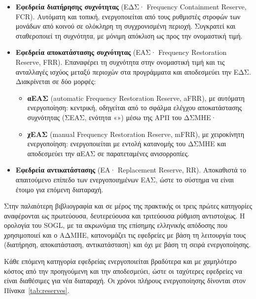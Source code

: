 \begin{itemize}
\item \textbf{Εφεδρεία διατήρησης συχνότητας} (ΕΔΣ· Frequency Containment Reserve, FCR).
      Αυτόματη και τοπική, ενεργοποιείται από τους ρυθμιστές στροφών των μονάδων από κοινού σε
      ολόκληρη τη συγχρονισμένη περιοχή. Συγκρατεί και σταθεροποιεί τη συχνότητα, με μόνιμη
      απόκλιση ως προς την ονομαστική τιμή.
\item \textbf{Εφεδρεία αποκατάστασης συχνότητας} (ΕΑΣ· Frequency Restoration Reserve, FRR).
      Επαναφέρει τη συχνότητα στην ονομαστική τιμή και τις ανταλλαγές ισχύος μεταξύ περιοχών
      στα προγράμματα και αποδεσμεύει την ΕΔΣ. Διακρίνεται σε δύο μορφές:
      \begin{itemize}
      \item \textbf{αΕΑΣ} (automatic Frequency Restoration Reserve, aFRR), με αυτόματη ενεργοποίηση: κεντρική, οδηγείται από το σφάλμα
            ελέγχου αποκατάστασης συχνότητας (ΣΕΑΣ, ενότητα «») μέσω της ΑΡΠ του
            ΔΣΜΗΕ·
      \item \textbf{χΕΑΣ} (manual Frequency Restoration Reserve, mFRR), με χειροκίνητη ενεργοποίηση: ενεργοποιείται με εντολή
            κατανομής του ΔΣΜΗΕ και αποδεσμεύει την αΕΑΣ σε παρατεταμένες ανισορροπίες.
      \end{itemize}
\item \textbf{Εφεδρεία αντικατάστασης} (ΕΑ· Replacement Reserve, RR). Αποκαθιστά το απαιτούμενο
      επίπεδο των ενεργοποιημένων ΕΑΣ, ώστε το σύστημα να είναι έτοιμο για επόμενη διαταραχή.
\end{itemize}

Στην παλαιότερη βιβλιογραφία και σε μέρος της πρακτικής οι τρεις πρώτες κατηγορίες
αναφέρονται ως πρωτεύουσα, δευτερεύουσα και τριτεύουσα ρύθμιση αντιστοίχως. Η ορολογία του
SOGL, με τα ακρωνύμια της επίσημης ελληνικής απόδοσης που χρησιμοποιεί και ο ΑΔΜΗΕ,
κατονομάζει τις εφεδρείες με βάση τη λειτουργία τους (διατήρηση, αποκατάσταση,
αντικατάσταση) και όχι με βάση τη σειρά ενεργοποίησης.

Κάθε επόμενη κατηγορία εφεδρείας ενεργοποιείται βραδύτερα και με χαμηλότερο κόστος από την
προηγούμενη και την αποδεσμεύει, ώστε οι ταχύτερες εφεδρείες να είναι διαθέσιμες για νέα
διαταραχή. Οι χρόνοι πλήρους ενεργοποίησης δίνονται στον Πίνακα~\ref{tab:reserves}.

